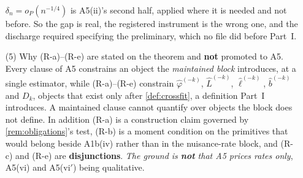 \begin{remark}
\begin{enumerate}
$\delta_n=o_P(n^{-1/4})$ is A5(ii)'s second half, applied where it is needed and not before. So the gap is real, the registered instrument is the wrong one, and the
discharge required specifying the preliminary, which no file did before Part~I.
\item[(5)] Why \textup{(R-a)}--\textup{(R-e)} are stated on the theorem and \textbf{not} promoted to
A5. Every clause of A5 constrains an object the \emph{maintained block} introduces, at a single
estimator, while (R-a)--(R-e) constrain $\hat\varphi^{(-k)}$, $\hat L^{(-k)}$, $\hat\ell^{(-k)}$,
$\hat b^{(-k)}$ and $D_k$, objects that exist only after \cref{def:crossfit}, a definition Part~I
introduces. A maintained clause cannot quantify over objects the block does not define. In
addition (R-a) is a construction claim governed by \cref{rem:obligations}'s test, (R-b) is a moment
condition on the primitives that would belong beside A1b(iv) rather than in the nuisance-rate block, and
(R-c) and (R-e) are \textbf{disjunctions}. \emph{The ground is \textbf{not} that A5 prices rates only},
A5(vi) and A5(vi$'$) being qualitative.
\end{enumerate}
\end{remark}


